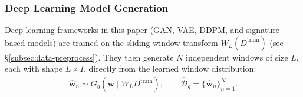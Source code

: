     \subsubsection{Deep Learning Model Generation}
    Deep-learning frameworks in this paper (GAN, VAE, DDPM, and
    signature-based models) are trained on the sliding-window transform
    $W_L(D^{\mathrm{train}})$ (see §\ref{subsec:data-preprocess}). They then
    generate $N$ independent windows of size $L$, each with shape
    $L\times I$, directly from the learned window distribution:
    \begin{align}
        \hat{\mathbf{w}}_n \sim G_g(\mathbf{w} \mid W_LD^{\mathrm{train}}), \qquad
        \hat{\mathcal{D}}_g = \{\hat{\mathbf{w}}_n\}_{n=1}^N.
    \end{align}











